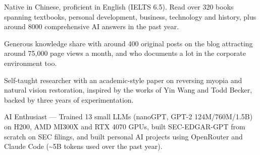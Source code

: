 \begin{cventry}
{\begin{cvitems}
            \item {Native in Chinese, proficient in English (IELTS 6.5). Read over 320 books spanning textbooks, personal development, business, technology and history, plus around 8000 comprehensive AI answers in the past year.}
            \item {Generous knowledge share with around 400 original posts on the blog attracting around 75,000 page views a month, and who documents a lot in the corporate environment too.}
            \item {Self-taught researcher with an academic-style paper on reversing myopia and natural vision restoration, inspired by the works of Yin Wang and Todd Becker, backed by three years of experimentation.}
            \item {AI Enthusiast --- Trained 13 small LLMs (nanoGPT, GPT-2 124M/760M/1.5B) on H200, AMD MI300X and RTX 4070 GPUs, built SEC-EDGAR-GPT from scratch on SEC filings, and built personal AI projects using OpenRouter and Claude Code (\textasciitilde5B tokens used over the past year).}
        \end{cvitems}
    }
\end{cventry}
